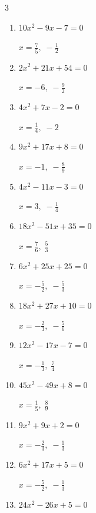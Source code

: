 \begin{multicols}{3}
\begin{enumerate}
  \item $10x^{2}-9x-7=0$

        $\displaystyle x=\frac{7}{5},\; -\frac{1}{2}$

  \item $2x^{2}+21x+54=0$

        $\displaystyle x=-6,\; -\frac{9}{2}$

  \item $4x^{2}+7x-2=0$

        $\displaystyle x=\frac{1}{4},\; -2$

  \item $9x^{2}+17x+8=0$

        $\displaystyle x=-1,\; -\frac{8}{9}$

  \item $4x^{2}-11x-3=0$

        $\displaystyle x=3,\; -\frac{1}{4}$

  \item $18x^{2}-51x+35=0$

        $\displaystyle x=\frac{7}{6},\; \frac{5}{3}$

  \item $6x^{2}+25x+25=0$

        $\displaystyle x=-\frac{5}{2},\; -\frac{5}{3}$

  \item $18x^{2}+27x+10=0$

        $\displaystyle x=-\frac{2}{3},\; -\frac{5}{6}$

\columnbreak %

\resetques

  \item $12x^{2}-17x-7=0$

        $\displaystyle x=-\frac{1}{3},\; \frac{7}{4}$

  \item $45x^{2}-49x+8=0$

        $\displaystyle x=\frac{1}{5},\; \frac{8}{9}$

  \item $9x^{2}+9x+2=0$

        $\displaystyle x=-\frac{2}{3},\; -\frac{1}{3}$

  \item $6x^{2}+17x+5=0$

        $\displaystyle x=-\frac{5}{2},\; -\frac{1}{3}$

  \item $24x^{2}-26x+5=0$


\end{enumerate}
\end{multicols}
